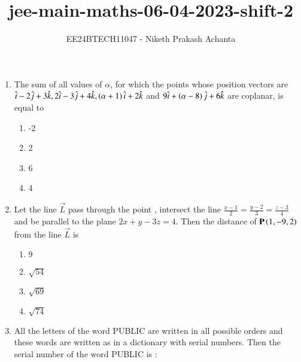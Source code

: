 \documentclass[journal]{IEEEtran}
\renewcommand{\thefigure}{\theenumi}
\renewcommand{\thetable}{\theenumi}
\numberwithin{equation}{enumi}
\numberwithin{figure}{enumi}
\renewcommand{\thetable}{\theenumi}
\begin{document}

\vspace{3cm}

\title{jee-main-maths-06-04-2023-shift-2}
\author{EE24BTECH11047 - Niketh Prakash Achanta}
{\let\newpage\relax\maketitle}
\renewcommand{\thefigure}{\theenumi}
\renewcommand{\thetable}{\theenumi}
\begin{enumerate}[start=16]
    \item The sum of all values of $\alpha$, for which the points whose position vectors are $\hat{i}-2\hat{j}+3\hat{k}, 2\hat{i}-3\hat{j}+4\hat{k}, \left(\alpha+1\right)\hat{i}+2\hat{k}$ and $9\hat{i}+\left(\alpha-8\right)\hat{j}+6\hat{k}$ are coplanar, is equal to \\ 
    \begin{multicols}{4}
    \begin{enumerate}
        \item -2
        \item 2
        \item 6
        \item 4
    \end{enumerate}
    \end{multicols}
    \item Let the line $\vec{L}$ pass through the point , intersect the line $\frac{x-1}{2}=\frac{y-2}{3}=\frac{z-3}{4}$ and be parallel to the plane $2x+y-3z=4$. Then the distance of $\mathbf{P}\left(1,-9,2\right)$ from the line $\vec{L}$ is \\
    \begin{multicols}{4}
    \begin{enumerate}
        \item $9$
        \item $\sqrt{54}$
        \item $\sqrt{69}$
        \item $\sqrt{74}$
    \end{enumerate} 
    \end{multicols}
    \item All the letters of the word PUBLIC are written in all possible orders and these words are written as in a dictionary with serial numbers. Then the serial number of the word PUBLIC is :   \\

\end{enumerate}
\end{document}

